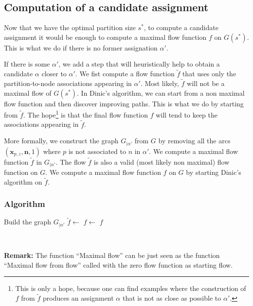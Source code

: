 \documentclass[]{article}
\begin{document}
\subsection{Computation of a candidate assignment}

Now that we have the optimal partition size $s^*$, to compute a candidate assignment it would be enough to compute a maximal flow function $f$ on $G(s^*)$. This is what we do if there is no former assignation $\alpha'$.

If there is some $\alpha'$, we add a step that will heuristically help to obtain a candidate $\alpha$ closer to $\alpha'$. We fist compute a flow function $\tilde{f}$ that uses only the partition-to-node associations appearing in $\alpha'$. Most likely, $\tilde{f}$ will not be a maximal flow of $G(s^*)$. In Dinic's algorithm, we can start from a non maximal flow function and then discover improving paths. This is what we do by starting from $\tilde{f}$. The hope\footnote{This is only a hope, because one can find examples where the construction of $f$ from $\tilde{f}$ produces an assignment $\alpha$ that is not as close as possible to $\alpha'$.} is that the final flow function $f$ will tend to keep the associations appearing in $\tilde{f}$.

More formally, we construct the graph $G_{|\alpha'}$ from $G$ by removing all the arcs $(\mathbf{x}_{p,z},\mathbf{n}, 1)$ where $p$ is not associated to $n$ in $\alpha'$. We compute a maximal flow function $\tilde{f}$ in $G_{|\alpha'}$. The flow $\tilde{f}$ is also a valid (most likely non maximal) flow function on $G$. We compute a maximal flow function $f$ on $G$ by starting Dinic's algorithm on $\tilde{f}$.

\subsubsection*{Algorithm}
\begin{algorithmic}[1]
	\State Build the graph $G_{|\alpha'}$
	\State $ \tilde{f} \leftarrow$ 
	\State $ f \leftarrow$ 
	\State \Return $f$
	\EndFunction
\end{algorithmic}

~ 

\textbf{Remark:} The function ``Maximal flow'' can be just seen as the function ``Maximal flow from flow'' called with the zero flow function as starting flow.
\end{document}

